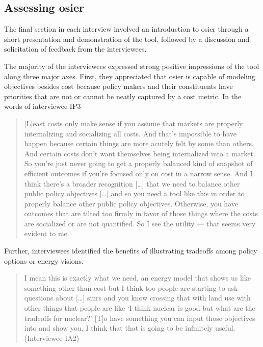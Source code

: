 \subsection{Assessing \ac{osier}}
\label{section:assess-osier} 

The final section in each interview involved an introduction to \ac{osier}
through a short presentation and demonstration of the tool, followed by a
discussion and solicitation of feedback from the interviewees. 

The majority of the interviewees expressed strong positive impressions of the
tool along three major axes. First, they appreciated that \ac{osier} is capable
of modeling objectives besides cost because policy makers and their constituents
have priorities that are not or cannot be neatly captured by a cost metric. In
the words of interviewee IP3
\begin{quote}
    [L]east costs only make sense if you assume that markets are properly
    internalizing and socializing all costs. And that's impossible to have
    happen because certain things are more acutely felt by some than others. And
    certain costs don't want themselves being internalized into a market. So
    you're just never going to get a properly balanced kind of snapshot of
    efficient outcomes if you're focused only on cost in a narrow sense. And I
    think there's a broader recognition [\dots] that we need to balance other
    public policy objectives [\dots] and so you need a tool like this in order
    to properly balance other public policy objectives. Otherwise, you have
    outcomes that are tilted too firmly in favor of those things where the costs
    are socialized or are not quantified. So I see the utility --- that seems
    very evident to me.
\end{quote}
Further, interviewees identified the benefits of illustrating tradeoffs among
policy options or energy visions.
\begin{quote}
    I mean this is exactly what we need, an energy model that shows us like
    something other than cost but I think too people are starting to ask
    questions about [\dots] \acp{smr} and you know crossing that with land use
    with other things that people are like `I think nuclear is good but what are
    the tradeoffs for nuclear?' [T]o have something you can input those
    objectives into and show you, I think that that is going to be infinitely
    useful. (Interviewee IA2)
\end{quote}


